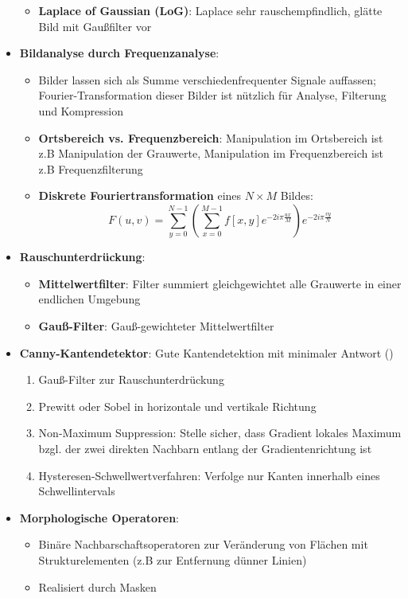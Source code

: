 \begin{itemize}
\begin{itemize}
$$		$$
		\item \textbf{Laplace of Gaussian (LoG)}: Laplace sehr rauschempfindlich, glätte Bild mit Gaußfilter vor
	\end{itemize}
	\item \textbf{Bildanalyse durch Frequenzanalyse}:
	\begin{itemize}
		\item Bilder lassen sich als Summe verschiedenfrequenter Signale auffassen; Fourier-Transformation dieser Bilder ist nützlich für Analyse, Filterung und Kompression
		\item \textbf{Ortsbereich vs. Frequenzbereich}: Manipulation im Ortsbereich ist z.B Manipulation der Grauwerte, Manipulation im Frequenzbereich ist z.B Frequenzfilterung
		\item \textbf{Diskrete Fouriertransformation} eines $N\times M$ Bildes:
		$$
			F(u, v) = \sum^{N-1}_{y = 0}(\sum^{M - 1}_{x = 0} f[x, y]e^{-2i\pi\frac{ux}{M}})e^{-2i\pi\frac{vy}{N}}
		$$
	\end{itemize}
	\item \textbf{Rauschunterdrückung}:
	\begin{itemize}
		\item \textbf{Mittelwertfilter}: Filter summiert gleichgewichtet alle Grauwerte in einer endlichen Umgebung
		\item \textbf{Gauß-Filter}: Gauß-gewichteter Mittelwertfilter
	\end{itemize}
	\item \textbf{Canny-Kantendetektor}: Gute Kantendetektion mit minimaler Antwort ()
	\begin{enumerate}
		\item Gauß-Filter zur Rauschunterdrückung
		\item Prewitt oder Sobel in horizontale und vertikale Richtung
		\item Non-Maximum Suppression: Stelle sicher, dass Gradient lokales Maximum bzgl. der zwei direkten Nachbarn entlang der Gradientenrichtung ist
		\item Hysteresen-Schwellwertverfahren: Verfolge nur Kanten innerhalb eines Schwellintervals
	\end{enumerate}
	\newpage
	\item \textbf{Morphologische Operatoren}:
	\begin{itemize}
		\item Binäre Nachbarschaftsoperatoren zur Veränderung von Flächen mit Strukturelementen (z.B zur Entfernung dünner Linien)
		\item Realisiert durch Masken

\end{itemize}
\end{itemize}
